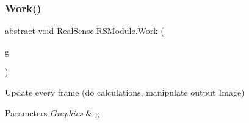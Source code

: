 \subsubsection{\texorpdfstring{Work()}{Work()}}
{\footnotesize\ttfamily abstract void Real\+Sense.\+R\+S\+Module.\+Work (\begin{DoxyParamCaption}\item[{Graphics}]{g }\end{DoxyParamCaption})\hspace{0.3cm}{\ttfamily [pure virtual]}}

Update every frame (do calculations, manipulate output Image) 
\begin{DoxyParams}{Parameters}
{\em Graphics} & g \\
\hline
\end{DoxyParams}



